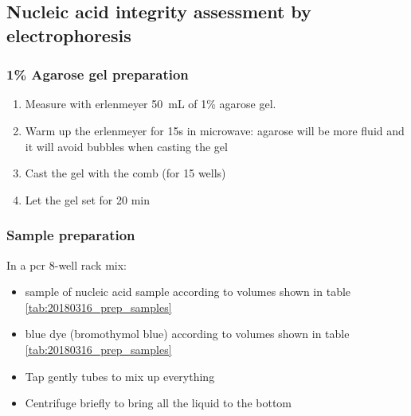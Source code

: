 \subsection{Nucleic acid integrity assessment by electrophoresis}
\label{task:20180316_cj0}

\subsubsection{1\% Agarose gel preparation}

\begin{enumerate}
\item Measure with erlenmeyer 50~mL of 1\% agarose gel.
\item Warm up the erlenmeyer for 15s in microwave: agarose will be more fluid and it will avoid bubbles when casting the gel
\item Cast the gel with the comb (for 15 wells)
\item Let the gel set for 20 min
\end{enumerate}


\subsubsection{Sample preparation}

In a \gls{pcr} 8-well rack mix:
\begin{itemize}
\item sample of nucleic acid sample according to volumes shown in table \ref{tab:20180316_prep_samples}
\item blue dye (bromothymol blue) according to volumes shown in table \ref{tab:20180316_prep_samples}
\item Tap gently tubes to mix up everything
\item Centrifuge briefly to bring all the liquid to the bottom
\end{itemize}

